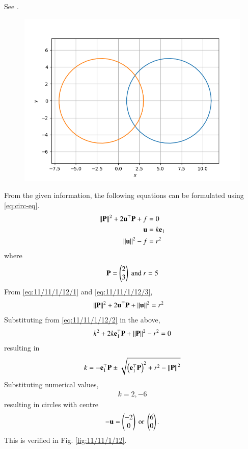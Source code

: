 See 
		.
	\begin{figure}[!ht]
		\centering
 \includegraphics[width=\columnwidth]{chapters/11/11/1/12/figs/conic.png}
		\caption{}
		\label{fig:11/11/1/12}
  	\end{figure}
From the given information, the following equations can be formulated
using 
	\eqref{eq:circ-eq}.
\begin{align}
		\label{eq:11/11/1/12/1}
	\left\lVert\mathbf{P}\right\rVert^2 + 2 \mathbf{u}^{\top}\mathbf{P} + f &= 0
	\\
		\label{eq:11/11/1/12/2}
	\mathbf{u} &= k\mathbf{e}_1
	\\
		\label{eq:11/11/1/12/3}
	\left\lVert\mathbf{u}\right\rVert^2 - f &= r^2
\end{align}
where 
\begin{align}
	\mathbf{P} = \begin{pmatrix}2\\3\end{pmatrix} \text{ and } r = 5
\end{align}
From 
		\eqref{eq:11/11/1/12/1}
		and 
		\eqref{eq:11/11/1/12/3},
\begin{align}
	\left\lVert\mathbf{P}\right\rVert^2 + 2 \mathbf{u}^{\top}\mathbf{P} + \left\lVert\mathbf{u}\right\rVert^2 &= r^2
\end{align}
Substituting from 
		\eqref{eq:11/11/1/12/2} in the above, 
\begin{align}
	k^2  + 2k \mathbf{e}_1^{\top}\mathbf{P} + \left\lVert\mathbf{P}\right\rVert^2- r^2 = 0
\end{align}
resulting in 
\begin{align}
	k =  - \mathbf{e}_1^{\top}\mathbf{P} \pm \sqrt{\left({ \mathbf{e}_1^{\top}\mathbf{P}  }\right)^2 + r^2 - \left\lVert\mathbf{P}\right\rVert^2 } 
\end{align}
Substituting numerical values, 
\begin{align}
	k = 2, -6
\end{align}
resulting in circles with centre
\begin{align}
	-\mathbf{u} = \begin{pmatrix}-2 \\ 0\end{pmatrix} \text{ or } \begin{pmatrix}6 \\ 0\end{pmatrix}.
\end{align}
This is verified in Fig. 
		\eqref{fig:11/11/1/12}.
